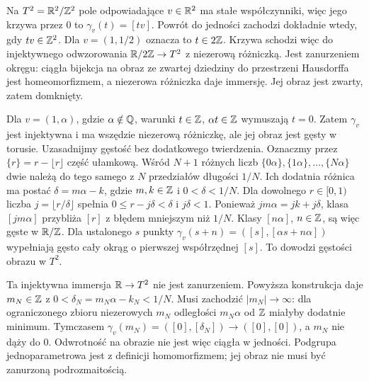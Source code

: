 \begin{przyklad}
\label{prz:lie-torus-podgrupy}
Na $T^2=\mathbb{R}^2/\mathbb{Z}^2$ pole odpowiadające $v\in\mathbb{R}^2$ ma
stałe współczynniki, więc jego krzywa przez $0$ to
$\gamma_v(t)=[tv]$.
Powrót do jedności zachodzi dokładnie wtedy, gdy
$tv\in\mathbb{Z}^2$.
Dla $v=(1,1/2)$ oznacza to $t\in2\mathbb{Z}$.
Krzywa schodzi więc do injektywnego odwzorowania
$\mathbb{R}/2\mathbb{Z}\to T^2$ z niezerową różniczką.
Jest zanurzeniem okręgu: ciągła bijekcja na obraz
ze zwartej dziedziny do przestrzeni Hausdorffa jest
homeomorfizmem, a niezerowa różniczka daje immersję.
Jej obraz jest zwarty, zatem domknięty.

Dla $v=(1,\alpha)$, gdzie $\alpha\notin\mathbb{Q}$,
warunki $t\in\mathbb{Z}$, $\alpha t\in\mathbb{Z}$ wymuszają $t=0$.
Zatem $\gamma_v$ jest injektywna i ma wszędzie
niezerową różniczkę, ale jej obraz jest gęsty w torusie.
Uzasadnijmy gęstość bez dodatkowego twierdzenia.
Oznaczmy przez $\{r\}=r-\lfloor r\rfloor$ część ułamkową.
Wśród $N+1$ różnych liczb
$\{0\alpha\},\{1\alpha\},\ldots,\{N\alpha\}$
dwie należą do tego samego z $N$ przedziałów długości $1/N$.
Ich dodatnia różnica ma postać
$\delta=m\alpha-k$, gdzie $m,k\in\mathbb{Z}$ i $0<\delta<1/N$.
Dla dowolnego $r\in[0,1)$ liczba $j=\lfloor r/\delta\rfloor$
spełnia $0\leq r-j\delta<\delta$ i $j\delta<1$.
Ponieważ $jm\alpha=jk+j\delta$, klasa $[jm\alpha]$
przybliża $[r]$ z błędem mniejszym niż $1/N$.
Klasy $[n\alpha]$, $n\in\mathbb{Z}$, są więc gęste w $\mathbb{R}/\mathbb{Z}$.
Dla ustalonego $s$ punkty
$\gamma_v(s+n)=([s],[\alpha s+n\alpha])$
wypełniają gęsto cały okrąg o pierwszej współrzędnej $[s]$.
To dowodzi gęstości obrazu w $T^2$.

Ta injektywna immersja $\mathbb{R}\to T^2$ nie jest zanurzeniem.
Powyższa konstrukcja daje $m_N\in\mathbb{Z}$ z
$0<\delta_N=m_N\alpha-k_N<1/N$.
Musi zachodzić $|m_N|\to\infty$: dla ograniczonego
zbioru niezerowych $m_N$ odległości $m_N\alpha$ od $\mathbb{Z}$
miałyby dodatnie minimum.
Tymczasem $\gamma_v(m_N)=([0],[\delta_N])\to([0],[0])$,
a $m_N$ nie dąży do $0$. Odwrotność na obrazie
nie jest więc ciągła w jedności.
Podgrupa jednoparametrowa jest z definicji homomorfizmem;
jej obraz nie musi być zanurzoną podrozmaitością.
\end{przyklad}

